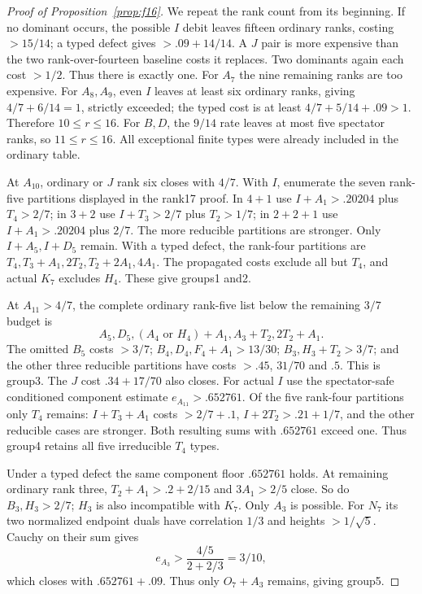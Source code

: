 \documentclass[11pt]{article}
\begin{document}
\begin{proof}[Proof of Proposition~\ref{prop:f16}]
We repeat the rank count from its beginning. If no dominant occurs,
the possible $I$ debit leaves fifteen ordinary ranks, costing $>15/14$;
a typed defect gives $>.09+14/14$. A $J$ pair is more expensive than
the two rank-over-fourteen baseline costs it replaces. Two dominants
again each cost $>1/2$. Thus there is exactly one.
For $A_7$ the nine remaining ranks are too expensive. For $A_8,A_9$,
even $I$ leaves at least six ordinary ranks, giving
$4/7+6/14=1$, strictly exceeded; the typed cost is at least
$4/7+5/14+.09>1$. Therefore $10\le r\le16$.
For $B,D$, the $9/14$ rate leaves at most five spectator ranks,
so $11\le r\le16$. All exceptional finite types were already
included in the ordinary table.

At $A_{10}$, ordinary or $J$ rank six closes with $4/7$.
With $I$, enumerate the seven rank-five partitions displayed in the
rank17 proof. In $4+1$ use $I+A_1>.20204$ plus $T_4>2/7$;
in $3+2$ use $I+T_3>2/7$ plus $T_2>1/7$; in $2+2+1$
use $I+A_1>.20204$ plus $2/7$. The more reducible partitions
are stronger. Only $I+A_5,I+D_5$ remain.
With a typed defect, the rank-four partitions are
$T_4,T_3+A_1,2T_2,T_2+2A_1,4A_1$.
The propagated costs exclude all but $T_4$, and actual $K_7$
excludes $H_4$. These give groups1 and2.

At $A_{11}>4/7$, the complete ordinary rank-five list below the
remaining $3/7$ budget is
\[
 A_5,D_5,(A_4\text{ or }H_4)+A_1,A_3+T_2,2T_2+A_1.
\]
The omitted $B_5$ costs $>3/7$;
$B_4,D_4,F_4+A_1>13/30$;
$B_3,H_3+T_2>3/7$; and the other three reducible partitions
have costs $>.45$, $31/70$ and $.5$. This is group3.
The $J$ cost $.34+17/70$ also closes.
For actual $I$ use the spectator-safe conditioned component estimate
$e_{A_{11}}>.652761$. Of the five rank-four partitions only $T_4$
remains: $I+T_3+A_1$ costs $>2/7+.1$,
$I+2T_2>.21+1/7$, and the other reducible cases are stronger.
Both resulting sums with $.652761$ exceed one. Thus group4 retains
all five irreducible $T_4$ types.

Under a typed defect the same component floor $.652761$ holds.
At remaining ordinary rank three, $T_2+A_1>.2+2/15$ and
$3A_1>2/5$ close. So do $B_3,H_3>2/7$; $H_3$ is also
incompatible with $K_7$. Only $A_3$ is possible. For $N_7$ its
two normalized endpoint duals have correlation $1/3$ and heights
$>1/\sqrt5$. Cauchy on their sum gives
\[
 e_{A_3}>\frac{4/5}{2+2/3}=3/10,
\]
which closes with $.652761+.09$. Thus only $O_7+A_3$ remains,
giving group5.


\end{proof}
\end{document}
